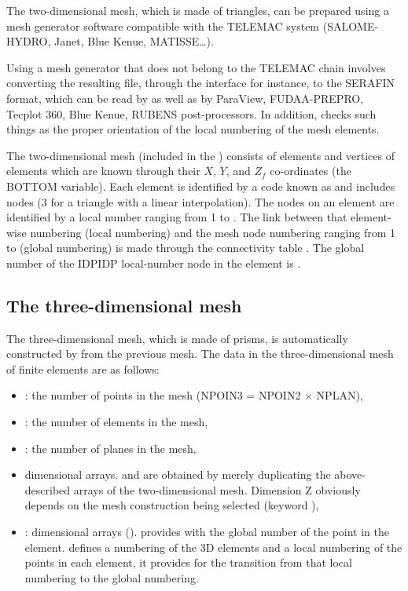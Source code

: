 The two-dimensional mesh, which is made of triangles, can be prepared using a
mesh generator software compatible with the TELEMAC system (SALOME-HYDRO,
Janet, Blue Kenue, MATISSE\dots).

Using a mesh generator that does not belong to the TELEMAC chain involves
converting the resulting file, through the \stbtel interface for instance, to
the SERAFIN format, which can be read by \tel as well as by ParaView,
FUDAA-PREPRO, Tecplot 360, Blue Kenue, RUBENS post-processors.
In addition, \stbtel checks such things as the proper orientation of the local
numbering of the mesh elements.

The two-dimensional mesh (included in the ) consists of
 elements and  vertices of elements which are
known through their $X$, $Y$, and $Z_{f}$ co-ordinates (the BOTTOM
variable). Each element is identified by a code known as  and
includes  nodes (3 for a triangle with a linear interpolation).
The nodes on an element are identified by a local number ranging from 1 to
. The link between that element-wise numbering (local numbering)
and the mesh node numbering ranging from 1 to  (global numbering)
is made through the connectivity table .
The global number of the IDPIDP local-number node in the  element
is .


\subsection{The three-dimensional mesh}

The three-dimensional mesh, which is made of prisms, is automatically
constructed by  from the previous mesh. The data in the
three-dimensional mesh of finite elements are as follows:

\begin{itemize}
\item {}: the number of points in the mesh (NPOIN3 = NPOIN2 $\times$
NPLAN),
\item {}: the number of elements in the mesh,
\item {}: the number of planes in the mesh,
\item {} dimensional arrays.  and 
are obtained by merely duplicating the above-described arrays of the two-dimensional
mesh. Dimension Z obviously depends on the mesh construction being selected
(keyword ),
\item {}: dimensional arrays ().
 provides with the global number of the  point
in the  element.  defines a numbering
of the 3D elements and a local numbering of the points in each element, it
provides for the transition from that local numbering to the global numbering.
\end{itemize}

